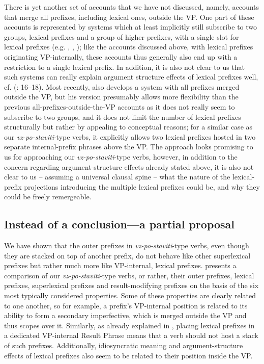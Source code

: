 \documentclass[output=paper,colorlinks,citecolor=brown]{langscibook}
\begin{document}
There is yet another set of accounts that we have not discussed, namely, accounts that merge all prefixes, including lexical ones, outside the VP. One part of these accounts is represented by systems which at least implicitly still subscribe to two groups, lexical prefixes and a group of higher prefixes, with a single slot for lexical prefixes (e.g. \citealt{slabakova2005}, \citealt{istratkova2006}, \citealt{wiland2012prefix}); like the accounts discussed above, with lexical prefixes originating VP-internally, these accounts thus generally also end up with a restriction to a single lexical prefix. In addition, it is also not clear to us that such systems can really explain argument structure effects of lexical prefixes well, cf. \citeauthor{zaucer2009vp} (\citeyear{zaucer2009vp}: 16--18). Most recently, \citet{biskup2023} also develops a system with all prefixes merged outside the VP, but his version presumably allows more flexibility than the previous all-prefixes-outside-the-VP accounts as it does not really seem to subscribe to two groups, and it does not limit the number of lexical prefixes structurally but rather by appealing to conceptual reasons; for a similar case as our \textit{vz-po-staviti}-type verbs, it explicitly allows two lexical prefixes hosted in two separate internal-prefix phrases above the VP. The approach looks promising to us for approaching our \textit{vz-po-staviti}-type verbs, however, in addition to the concern regarding argument-structure effects already stated above, it is also not clear to us -- assuming a universal clausal spine -- what the nature of the lexical-prefix projections introducing the multiple lexical prefixes could be, and why they could be freely remergeable.     


\subsection{Instead of a conclusion---a partial proposal}\label{sec:4.3_proposal}
We have shown that the outer prefixes in \textit{vz-po-staviti}-type verbs, even though they are stacked on top of another prefix, do not behave like other superlexical prefixes but rather much more like VP-internal, lexical prefixes.  presents a comparison of our \textit{vz-po-staviti}-type verbs, or rather, their outer prefixes, lexical prefixes, superlexical prefixes and result-modifying prefixes on the basis of the six most typically considered properties. Some of these properties are clearly related to one another, so for example, a prefix's VP-internal position is related to its ability to form a secondary imperfective, which is merged outside the VP and thus scopes over it. Similarly, as already explained in , placing lexical prefixes in a dedicated VP-internal Result Phrase means that a verb should not host a stack of such prefixes. Additionally, idiosyncratic meaning and argument-structure effects of lexical prefixes also seem to be related to their position inside the VP.
\end{document}
